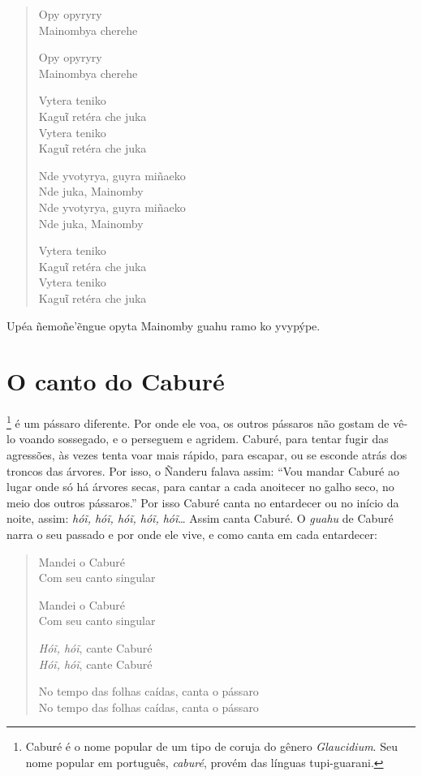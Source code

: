 \begin{verse}
Opy opyryry\\
Mainombya cherehe

Opy opyryry\\
Mainombya cherehe

Vytera teniko\\
Kaguῖ retéra che juka\\
Vytera teniko\\
Kaguῖ retéra che juka

Nde yvotyrya, guyra miñaeko\\
Nde juka, Mainomby\\
Nde yvotyrya, guyra miñaeko\\
Nde juka, Mainomby

\pagebreak
Vytera teniko\\
Kaguῖ retéra che juka\\
Vytera teniko\\
Kaguῖ retéra che juka
\end{verse}

Upéa ñemoñe'ẽngue opyta Mainomby guahu ramo ko yvypýpe.

\chapter{O canto do Caburé}

\footnote{Caburé é o nome popular de um tipo de coruja do gênero
  \textit{Glaucidium}. Seu nome popular em português, \textit{caburé},
  provém das línguas tupi-guarani.} é um pássaro diferente. Por onde ele
voa, os outros pássaros não gostam de vê-lo voando sossegado, e o
perseguem e agridem. Caburé, para tentar fugir das agressões, às vezes
tenta voar mais rápido, para escapar, ou se esconde atrás dos troncos
das árvores. Por isso, o Ñanderu falava assim: ``Vou mandar Caburé ao
lugar onde só há árvores secas, para cantar a cada anoitecer no galho
seco, no meio dos outros pássaros.'' Por isso Caburé canta no entardecer
ou no início da noite, assim: \textit{hóĩ, hóĩ, hóĩ, hóĩ, hóĩ}\ldots{} Assim canta
Caburé. O \textit{guahu} de Caburé narra o seu passado e por onde ele
vive, e como canta em cada entardecer:

\begin{verse}
Mandei o Caburé\\
Com seu canto singular

Mandei o Caburé\\
Com seu canto singular

\textit{Hóĩ, hóĩ}, cante Caburé\\
\textit{Hóĩ, hóĩ}, cante Caburé

No tempo das folhas caídas, canta o pássaro\\
No tempo das folhas caídas, canta o pássaro
\end{verse}

